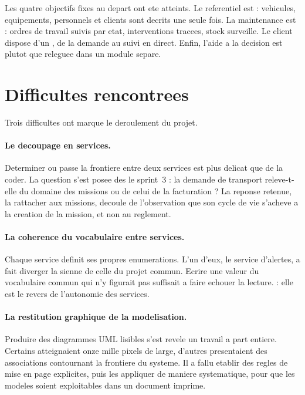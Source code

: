 Les quatre objectifs fixes au depart ont ete atteints. Le referentiel est
 : vehicules, equipements, personnels et clients sont
decrits une seule fois. La maintenance est  :
ordres de travail suivis par etat, interventions tracees, stock surveille.
Le client dispose d'un , de la demande au suivi
en direct. Enfin, l'aide a la decision est  plutot que releguee dans un module separe.

\section*{Difficultes rencontrees}

Trois difficultes ont marque le deroulement du projet.

\paragraph{Le decoupage en services.}
Determiner ou passe la frontiere entre deux services est plus delicat que
de la coder. La question s'est posee des le sprint~3 : la demande de
transport releve-t-elle du domaine des missions ou de celui de la
facturation ? La reponse retenue, la rattacher aux missions, decoule de
l'observation que son cycle de vie s'acheve a la creation de la mission,
et non au reglement.

\paragraph{La coherence du vocabulaire entre services.}
Chaque service definit ses propres enumerations. L'un d'eux, le service
d'alertes, a fait diverger la sienne de celle du projet commun. Ecrire une
valeur du vocabulaire commun qui n'y figurait pas suffisait a faire
echouer la lecture.  : elle
est le revers de l'autonomie des services.

\paragraph{La restitution graphique de la modelisation.}
Produire des diagrammes UML lisibles s'est revele un travail a part
entiere. Certains atteignaient onze mille pixels de large, d'autres
presentaient des associations contournant la frontiere du systeme. Il a
fallu etablir des regles de mise en page explicites, puis les appliquer
de maniere systematique, pour que les modeles soient exploitables dans un
document imprime.

